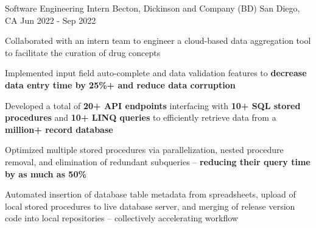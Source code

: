 

\begin{cventries}

  \cventry
  {Software Engineering Intern} %
  {Becton, Dickinson and Company (BD)} %
  {San Diego, CA} %
  {Jun 2022 - Sep 2022} %
  {\begin{cvitems} %
      \item {Collaborated with an intern team to engineer a cloud-based data aggregation tool to facilitate the curation of drug concepts}
      \item { Implemented input field auto-complete and data validation features to \textbf{decrease data entry time by 25\%+ and reduce data corruption} }
      \item {Developed a total of \textbf{20+ API endpoints} interfacing with \textbf{10+ SQL stored procedures} and \textbf{10+ LINQ queries} to efficiently retrieve data from a \textbf{million+ record database}}
      \item {Optimized multiple stored procedures via parallelization, nested procedure removal, and elimination of redundant subqueries -- \textbf{reducing their query time by as much as 50\%}}
      \item {Automated insertion of database table metadata from spreadsheets, upload of local stored procedures to live database server, and merging of release version code into local repositories -- collectively accelerating workflow}
    \end{cvitems}
  }


\end{cventries}
